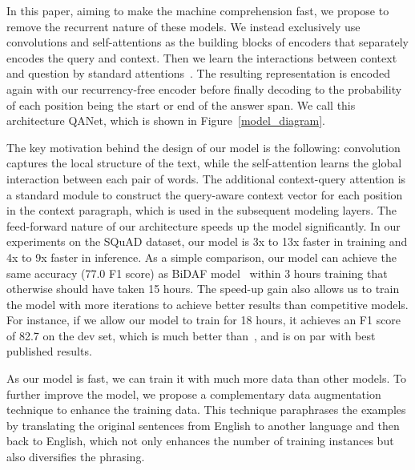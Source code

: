 \documentclass{article} \usepackage{iclr2018_conference,times}
\begin{document}
In this paper, aiming to make the machine comprehension fast, we propose to remove the recurrent nature of these models. We instead exclusively use convolutions and self-attentions as the building blocks of encoders that separately encodes the query and context. Then we learn the interactions between context and question by standard attentions~\citep{XiongZS16,SeoKFH16,bahdanau2014neural}.  
The resulting representation is encoded again with our recurrency-free encoder before finally decoding to the probability of each position being the start or end of the answer span. 
We call this architecture QANet, which is shown in Figure~\ref{model_diagram}.  


The key motivation behind the design of our model is the following:
convolution captures the local structure of the text, while the self-attention learns the global interaction between each pair of words. The additional context-query attention is a standard module to construct the query-aware context vector for each position in the context paragraph, which is used in the subsequent modeling layers. 
The feed-forward nature of our architecture speeds up the model significantly. In our experiments on the SQuAD dataset, our model is 3x to 13x faster in training and 4x to 9x faster in inference. As a simple comparison, our model can achieve the same accuracy (77.0 F1 score) as BiDAF model~\citep{SeoKFH16} within 3 hours training that otherwise should have taken 15 hours. The speed-up gain also allows us to train the model with more iterations to achieve better results than competitive models. For instance, if we allow our model to train for 18 hours, it achieves an F1 score of 82.7 on the dev set, which is much better than~\citep{SeoKFH16}, and is on par with best published results. 


As our model is fast, we can train it with much more data than other models. To further improve the model, we propose a complementary data augmentation technique to enhance the training data. 
This technique paraphrases the examples by translating the original sentences from English to another language and then back to English, which not only enhances the number of training instances but also diversifies the phrasing.
\end{document}
